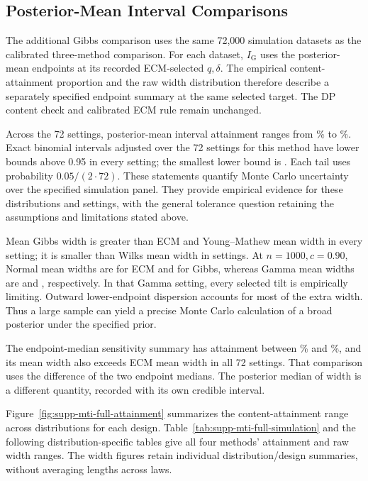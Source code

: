 \subsection{Posterior-Mean Interval Comparisons}
\label{sec:supp-mti-full-validation}

The additional Gibbs comparison uses the same 72,000 simulation datasets
as the calibrated three-method comparison. For each dataset,
\(I_{\mathrm G}\) uses the posterior-mean endpoints at its recorded
ECM-selected \(q,\delta\). The empirical content-attainment proportion
and the raw width distribution therefore describe a separately specified
endpoint summary at the same selected target. The DP content check and
calibrated ECM rule remain unchanged.

Across the 72 settings, posterior-mean interval attainment ranges from
\MTIFullAttainmentMin\% to \MTIFullAttainmentMax\%.
Exact binomial intervals adjusted over the 72 settings for this method
have lower bounds above 0.95 in every setting; the smallest lower bound
is \MTIFullSimultaneousLower{}. Each tail uses probability
\(0.05/(2\cdot72)\). These statements quantify Monte Carlo uncertainty
over the specified simulation panel. They provide empirical evidence for
these distributions and settings, with the general tolerance question
retaining the assumptions and limitations stated above.

Mean Gibbs width is greater than ECM and Young--Mathew mean width in
every setting; it is smaller than Wilks mean width in
\MTIFullShorterWilks{} settings. At \(n=1000,c=0.90\), Normal mean widths
are \MTIFullNormalECM{} for ECM and \MTIFullNormalGibbs{} for Gibbs,
whereas Gamma mean widths are \MTIFullGammaECM{} and
\MTIFullGammaGibbs{}, respectively. In that Gamma setting, every selected
tilt is empirically limiting. Outward lower-endpoint dispersion accounts
for most of the extra width. Thus a large sample can yield a precise
Monte Carlo calculation of a broad posterior under the specified prior.

The endpoint-median sensitivity summary has attainment between
\MTIFullMedianAttainmentMin\% and \MTIFullMedianAttainmentMax\%, and its
mean width also exceeds ECM mean width in all 72 settings. That comparison
uses the difference of the two endpoint medians. The posterior median of
width is a different quantity, recorded with its own credible interval.

Figure~\ref{fig:supp-mti-full-attainment} summarizes the content-attainment
range across distributions for each design. Table~\ref{tab:supp-mti-full-simulation}
and the following distribution-specific tables give all four methods'
attainment and raw width ranges. The width figures retain individual
distribution/design summaries, without averaging lengths across laws.


